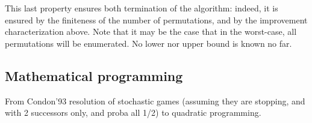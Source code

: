 This last property ensures both termination of the algorithm: indeed,
it is ensured by the finiteness of the number of permutations, and by
the improvement characterization above. Note that it may be the case
that in the worst-case, all permutations will be enumerated. No lower
nor upper bound is known no far.

\subsection{Mathematical programming}
From Condon'93 resolution of stochastic games (assuming they are
stopping, and with 2 successors only, and proba all 1/2) to quadratic
programming.
